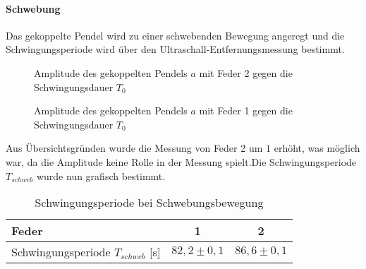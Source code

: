 \paragraph{Schwebung}
Das gekoppelte Pendel wird zu einer  schwebenden Bewegung angeregt und die Schwingungsperiode wird über den Ultraschall-Entfernungsmessung bestimmt.
\begin{figure}[H]
  \centering
  \caption{Amplitude des gekoppelten Pendels $a$ mit Feder 2 gegen die Schwingungsdauer $T_0$ }
  \label{fig:schwebschwingung1}
\end{figure}
\begin{figure}[H]
  \centering
  \caption{Amplitude des gekoppelten Pendels $a$ mit Feder 1 gegen die Schwingungsdauer $T_0$ }
  \label{fig:schwebschwingung2}
\end{figure}

Aus Übersichtsgründen wurde die Messung von Feder 2 um $1$ erhöht, was möglich war, da die Amplitude keine Rolle in der Messung spielt.Die Schwingungsperiode $T_{schweb}$ wurde nun grafisch bestimmt.
\begin{table}[H]
  \centering
  \begin{tabular}{l | c | c }
    Feder & 1 & 2\\ \hline
    Schwingungsperiode $T_{schweb}$ [s]& $82,2\pm 0,1$ & $86,6 \pm 0,1$
    
  \end{tabular}
  \caption{Schwingungsperiode bei Schwebungsbewegung}
  \label{tab:tschweb}
\end{table}
